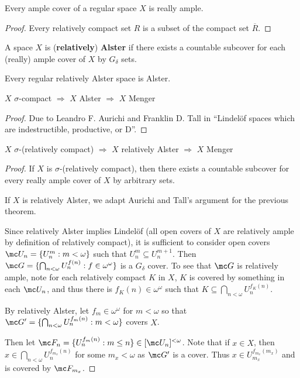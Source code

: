   \begin{prop}
    Every ample cover of a regular space $X$ is really ample.
  \end{prop}

  \begin{proof}
    Every relatively compact set $R$ is a subset of the compact set $\overline{R}$.
  \end{proof}

  \begin{defn}
    A space $X$ is (\textbf{relatively}) \textbf{Alster} if there exists a countable subcover for each (really) ample cover of $X$ by $G_\delta$ sets.
  \end{defn}

  \begin{prop}
    Every regular relatively Alster space is Alster.
  \end{prop}

  \begin{thm}
    $X$ $\sigma$-compact $\Rightarrow$ $X$ Alster $\Rightarrow$ $X$ Menger
  \end{thm}

  \begin{proof}
    Due to Leandro F. Aurichi and Franklin D. Tall in ``Lindel\"of spaces which are indestructible, productive, or D''.
  \end{proof}

  \begin{prop}
    $X$ $\sigma$-(relatively compact) $\Rightarrow$ $X$ relatively Alster $\Rightarrow$ $X$ Menger
  \end{prop}

  \begin{proof}
    If $X$ is $\sigma$-(relatively compact), then there exists a countable subcover for every really ample cover of $X$ by arbitrary sets.

    If $X$ is relatively Alster, we adapt Aurichi and Tall's argument for the previous theorem.

    Since relatively Alster implies Lindel\"of (all open covers of $X$ are relatively ample by definition of relatively compact), it is sufficient to consider open covers $\mc U_n = \{ U_n^m : m<\omega\}$ such that $U_n^m\subseteq U_n^{m+1}$. Then $\mc G=\{\bigcap_{n<\omega} U_n^{f(n)} : f\in \omega^\omega\}$ is a $G_\delta$ cover. To see that $\mc G$ is relatively ample, note for each relatively compact $K$ in $X$, $K$ is covered by something in each $\mc U_n$, and thus there is $f_K(n)\in\omega^\omega$ such that $K\subseteq \bigcap_{n<\omega} U_n^{f_K(n)}$.

    By relatively Alster, let $f_m\in\omega^\omega$ for $m<\omega$ so that $\mc G'=\{\bigcap_{n<\omega} U_n^{f_m(n)}:m<\omega\}$ covers $X$.

    Then let $\mc F_n = \{U_n^{f_m(n)}:m\leq n\}\in[\mc U_n]^{<\omega}$. Note that if $x\in X$, then $x\in \bigcap_{n<\omega} U_n^{f_{m_x}(n)}$ for some $m_x<\omega$ as $\mc G'$ is a cover. Thus $x\in U_{m_x}^{f_{m_x}(m_x)}$ and is covered by $\mc F_{m_x}$.
  \end{proof}

